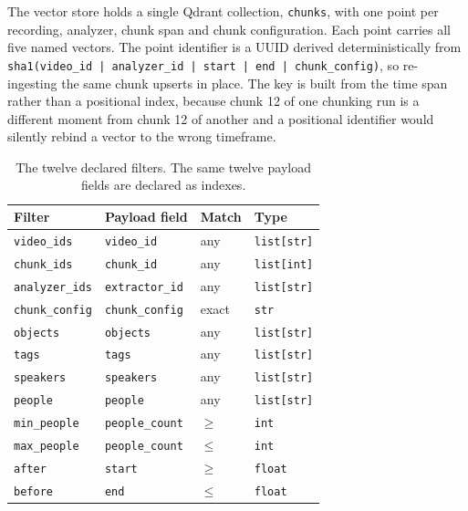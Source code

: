 \documentclass[11pt,a4paper]{article}
\begin{document}
The vector store holds a single Qdrant collection, \texttt{chunks}, with one
point per recording, analyzer, chunk span and chunk configuration. Each point
carries all five named vectors. The point identifier is a UUID derived
deterministically from
\texttt{sha1(video\_id\,|\,\allowbreak analyzer\_id\,|\,\allowbreak start\,|\,\allowbreak end\,|\,\allowbreak chunk\_config)},
so re-ingesting the same chunk upserts in place. The key is built from the time
span rather than a positional index, because chunk 12 of one chunking run is a
different moment from chunk 12 of another and a positional identifier would
silently rebind a vector to the wrong timeframe.

\begin{table}[htbp]
\centering
\small
\begin{tabularx}{\textwidth}{@{}L{2.4cm}L{2.3cm}L{1.8cm}X@{}}
\toprule
\textbf{Filter} & \textbf{Payload field} & \textbf{Match} & \textbf{Type} \\
\midrule
\texttt{video\_ids}    & \texttt{video\_id}     & any   & \texttt{list[str]} \\
\texttt{chunk\_ids}    & \texttt{chunk\_id}     & any   & \texttt{list[int]} \\
\texttt{analyzer\_ids} & \texttt{extractor\_id} & any   & \texttt{list[str]} \\
\texttt{chunk\_config} & \texttt{chunk\_config} & exact & \texttt{str} \\
\texttt{objects}       & \texttt{objects}       & any   & \texttt{list[str]} \\
\texttt{tags}          & \texttt{tags}          & any   & \texttt{list[str]} \\
\texttt{speakers}      & \texttt{speakers}      & any   & \texttt{list[str]} \\
\texttt{people}        & \texttt{people}        & any   & \texttt{list[str]} \\
\texttt{min\_people}   & \texttt{people\_count} & $\geq$ & \texttt{int} \\
\texttt{max\_people}   & \texttt{people\_count} & $\leq$ & \texttt{int} \\
\texttt{after}         & \texttt{start}         & $\geq$ & \texttt{float} \\
\texttt{before}        & \texttt{end}           & $\leq$ & \texttt{float} \\
\bottomrule
\end{tabularx}
\caption{The twelve declared filters. The same twelve payload fields are
declared as indexes.}
\end{table}
\end{document}
